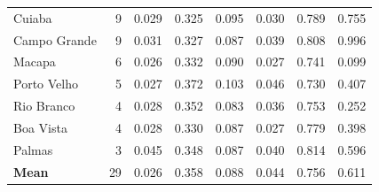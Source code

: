 \begin{table}[htbp]
{\begin{tabular}{lrrrrrrr}
Cuiaba & 9 & 0.029 & 0.325 & 0.095 & 0.030 & 0.789 & 0.755 \\
Campo Grande & 9 & 0.031 & 0.327 & 0.087 & 0.039 & 0.808 & 0.996 \\
Macapa & 6 & 0.026 & 0.332 & 0.090 & 0.027 & 0.741 & 0.099 \\
Porto Velho & 5 & 0.027 & 0.372 & 0.103 & 0.046 & 0.730 & 0.407 \\
Rio Branco & 4 & 0.028 & 0.352 & 0.083 & 0.036 & 0.753 & 0.252 \\
Boa Vista & 4 & 0.028 & 0.330 & 0.087 & 0.027 & 0.779 & 0.398 \\
Palmas & 3 & 0.045 & 0.348 & 0.087 & 0.040 & 0.814 & 0.596 \\
\midrule
\textbf{Mean} & 29 & 0.026 & 0.358 & 0.088 & 0.044 & 0.756 & 0.611 \\
\bottomrule
\end{tabular}%
}
\end{table}